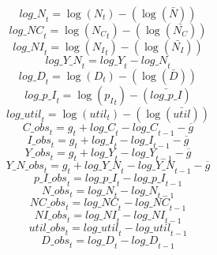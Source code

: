 \begin{dmath}
{log\_N}_{t}=\log\left({{N}}_{t}\right)-(\log\left(\bar{{N}}\right))
\end{dmath}
\begin{dmath}
{log\_NC}_{t}=\log\left({{N_C}}_{t}\right)-(\log\left(\bar{{N_C}}\right))
\end{dmath}
\begin{dmath}
{log\_NI}_{t}=\log\left({{N_I}}_{t}\right)-(\log\left(\bar{{N_I}}\right))
\end{dmath}
\begin{dmath}
{log\_Y\_N}_{t}={log\_Y}_{t}-{log\_N}_{t}
\end{dmath}
\begin{dmath}
{log\_D}_{t}=\log\left({{D}}_{t}\right)-(\log\left(\bar{{D}}\right))
\end{dmath}
\begin{dmath}
{log\_p\_I}_{t}=\log\left({{p_I}}_{t}\right)-(\bar{log\_p\_I})
\end{dmath}
\begin{dmath}
{log\_util}_{t}=\log\left({{util}}_{t}\right)-(\log\left(\bar{{util}}\right))
\end{dmath}
\begin{dmath}
{C\_obs}_{t}={{g}}_{t}+{log\_C}_{t}-{log\_C}_{t-1}-{{\overline{g}}}
\end{dmath}
\begin{dmath}
{I\_obs}_{t}={{g}}_{t}+{log\_I}_{t}-{log\_I}_{t-1}-{{\overline{g}}}
\end{dmath}
\begin{dmath}
{Y\_obs}_{t}={{g}}_{t}+{log\_Y}_{t}-{log\_Y}_{t-1}-{{\overline{g}}}
\end{dmath}
\begin{dmath}
{Y\_N\_obs}_{t}={{g}}_{t}+{log\_Y\_N}_{t}-{log\_Y\_N}_{t-1}-{{\overline{g}}}
\end{dmath}
\begin{dmath}
{p\_I\_obs}_{t}={log\_p\_I}_{t}-{log\_p\_I}_{t-1}
\end{dmath}
\begin{dmath}
{N\_obs}_{t}={log\_N}_{t}-{log\_N}_{t-1}
\end{dmath}
\begin{dmath}
{NC\_obs}_{t}={log\_NC}_{t}-{log\_NC}_{t-1}
\end{dmath}
\begin{dmath}
{NI\_obs}_{t}={log\_NI}_{t}-{log\_NI}_{t-1}
\end{dmath}
\begin{dmath}
{util\_obs}_{t}={log\_util}_{t}-{log\_util}_{t-1}
\end{dmath}
\begin{dmath}
{D\_obs}_{t}={log\_D}_{t}-{log\_D}_{t-1}
\end{dmath}

